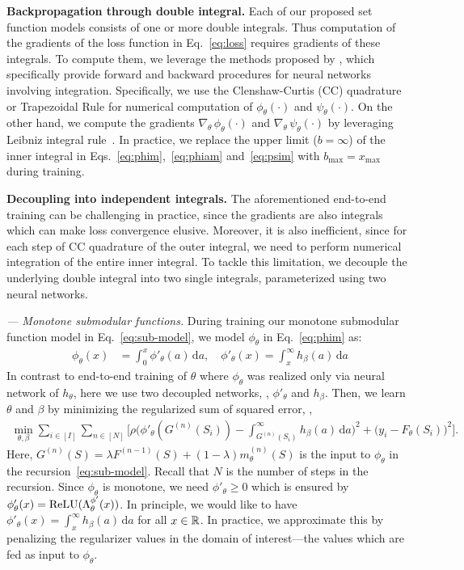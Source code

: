 \documentclass{article}
\newcommand{\ehdr}[1]{\noindent\emph{#1.}}
\newcommand{\xhdr}[1]{\noindent\textbf{#1.}}
\def\d{\mathrm{d}}
\renewcommand{\cite}{\citep}
\newcommand{\reg}{\rho}
\begin{document}
\xhdr{Backpropagation through double integral}
Each of our proposed set function models consists of one or more double integrals. 
Thus computation of the gradients of the loss function in Eq.~\eqref{eq:loss} requires gradients of these integrals.  To compute them,  we leverage the methods proposed by \citet{umnn}, which specifically provide forward and backward procedures for neural networks involving integration. Specifically, we use the Clenshaw-Curtis (CC) quadrature or Trapezoidal Rule for numerical computation of $\phi_{\theta}(\cdot)$ and $\psi_{\theta}(\cdot)$. On the other hand, we compute the gradients $\nabla_{\theta}\, \phi_{\theta}(\cdot)$ and $\nabla_{\theta}\, \psi_{\theta}(\cdot)$ by leveraging Leibniz integral rule~\cite{flanders1973differentiation}. In practice, we replace the upper limit ($b=\infty$) of the inner integral in Eqs.~\eqref{eq:phim},~\eqref{eq:phiam} and~\eqref{eq:psim} with  $b_{\max} =x_{\max}$ during training.

\xhdr{Decoupling into independent integrals}
The aforementioned end-to-end training can be challenging in practice, since the gradients are also integrals which can make loss convergence elusive. Moreover, it is also inefficient, since for each step of CC quadrature of the outer integral, we need to perform numerical integration of the entire inner integral. To tackle this limitation, we decouple the underlying double integral into two single integrals, parameterized using two neural networks.

\ehdr{--- Monotone submodular functions} During training our monotone submodular function model in Eq.~\eqref{eq:sub-model}, we model $\phi_{\theta}$ in Eq.~\eqref{eq:phim} as:
\begin{align}
    \phi_{\theta}(x) & = \int_{0} ^{x} \phi' _{\theta}(a) \, \d a,  \quad
     \phi' _{\theta}(x) = \int_{x} ^{\infty} h _{\beta}(a) \, \d a \label{eq:decouple-mon-sub}
\end{align}
%
In contrast to end-to-end training of $\theta$ where $\phi_{\theta}$ was realized only via neural network of $h_{\theta}$,
here we use two decoupled networks, \ie, $\phi' _{\theta}$ and $h_{\beta}$. Then, we learn 
$\theta$ and $\beta$ by minimizing the regularized sum of squared error, \ie,
\begin{align}
\min_{\theta,\beta} \sum_{i\in[I]} \sum_{n\in[N]}
\Big[ \reg \Big(\phi' _{\theta}(G^{(n)} (S_i))-\int_{G^{(n)}(S_i)} ^{\infty}
  h_{\beta}(a) \, \d a\Big)^2   
 + \big(y_i-F_{\theta}(S_i)\big)^2 \Big].  \label{eq:loss-mon-decoup}
\end{align}
Here, $G^{(n)}(S) = \lambda F^{(n-1)}(S) + (1-\lambda) m^{(n)} _{\theta}(S)$ is the input to $\phi_{\theta}$ in the recursion~\eqref{eq:sub-model}.
Recall that $N$ is the number of steps in the recursion.  Since $\phi_{\theta}$ is monotone, we need $\phi'_{\theta} \ge 0$ which is ensured by 
$\phi' _{\theta}(x) = \text{ReLU}(\Lambda^{\phi'} _{\theta} (x))$.
In principle, we would like to have $ \phi' _{\theta}(x) = \int_{x} ^{\infty} h _{\beta}(a) \, \d a$ for all $x\in \mathbb{R}$. In practice, we approximate this by penalizing the regularizer values in the domain of interest---the values which are fed as input to  $\phi_{\theta}$. 
\end{document}
